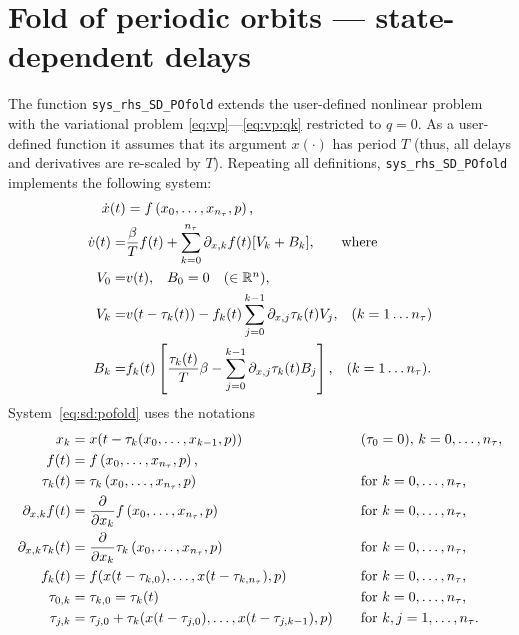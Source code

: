 \documentclass[11pt]{scrartcl}
\newcommand{\R}{\mathbb{R}}
\newcommand{\mlvar}[1]{\lstinline[keywordstyle=\color{var}]!#1!}
\begin{document}
\section{Fold of periodic orbits --- state-dependent delays}
\label{sec:sd:pofold}
The function \mlvar{sys_rhs_SD_POfold} extends the user-defined
nonlinear problem with the variational problem
\eqref{eq:vp}---\eqref{eq:vp:qk} restricted to $q=0$. As a
user-defined function it assumes that its argument $x(\cdot)$ has
period $T$ (thus, all delays and derivatives are re-scaled by
$T$). Repeating all definitions, \mlvar{sys_rhs_SD_POfold}
implements the following system:
\begin{equation}\label{eq:sd:pofold}
  \begin{aligned}
    \dot x(t)&=f\left(x_0,\ldots,x_{n_\tau},p\right)\mbox{,}\\
    \dot v(t)=&\frac{\beta}{T}f(t)+
    \sum_{k=0}^{n_\tau}\partial_{x,k}f(t)[V_k+B_k]
    \mbox{,\qquad where}\\
    V_0=&v(t)\mbox{,}\quad B_0=0\mbox{\quad ($\in\R^n)$,}\\
    V_k=&v(t-\tau_k(t))-f_k(t)\sum_{j=0}^{k-1}\partial_{x,j}
    \tau_k(t)V_j\mbox{,\quad($k=1\ldots n_\tau$)}\\
    B_k=&f_k(t)\left[\frac{\tau_k(t)}{T}\beta-
      \sum_{j=0}^{k-1}\partial_{x,j}
      \tau_k(t)B_j\right]\mbox{,\quad($k=1\ldots n_\tau$).}
  \end{aligned}
\end{equation}
System~\eqref{eq:sd:pofold} uses the notations
\begin{equation}\label{eq:sd:abbrevs}
  \begin{aligned}
    x_k&=x(t-\tau_k(x_0,\ldots,x_{k-1},p))&&\mbox{\quad ($\tau_0=0$),
       $k=0,\ldots,n_\tau$,}\\
    f(t)&=f\left(x_0,\ldots,x_{n_\tau},p\right)\mbox{,}&&\\
    \tau_k(t)&=\tau_k\left(x_0,\ldots,x_{n_\tau},p\right)&&\mbox{\quad for $k=0,\ldots,n_\tau$,}\\
    \partial_{x,k}f(t)&=\frac{\partial}{\partial
      x_k}f\left(x_0,\ldots,x_{n_\tau},p\right)
    &&\mbox{\quad for $k=0,\ldots,n_\tau$,}\\
    \partial_{x,k}\tau_k(t)&=\frac{\partial}{\partial
      x_k}\tau_k\left(x_0,\ldots,x_{n_\tau},p\right)
    &&\mbox{\quad for $k=0,\ldots,n_\tau$,}\\
    f_k(t)&=f(x(t-\tau_{k,0}),\ldots,x(t-\tau_{k,n_\tau}),p)
    &&\mbox{\quad for $k=0,\ldots,n_\tau$,}\\
    \tau_{0,k}&=\tau_{k,0}=\tau_k(t)&&\mbox{\quad for $k=0,\ldots,n_\tau$,}\\
    \tau_{j,k}&=\tau_{j,0}+\tau_k(x(t-\tau_{j,0}),
    \ldots,x(t-\tau_{j,k-1}),p)&&\mbox{\quad for
      $k,j=1,\ldots,n_\tau$.}
  \end{aligned}
\end{equation}
\end{document}
